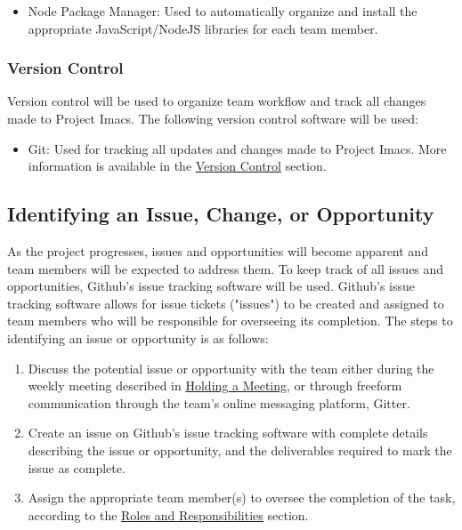 \documentclass{article}
\begin{document}
\begin{itemize}
\item Node Package Manager: Used to automatically organize and install the appropriate JavaScript/NodeJS libraries for each team member.
\end{itemize}

\subsubsection{Version Control}
Version control will be used to organize team workflow and track all changes made to Project Imacs. The following version control software will be used:

\begin{itemize}
\item Git: Used for tracking all updates and changes made to Project Imacs. More information is available in the \hyperref[sec:version-control]{Version Control} section.
\end{itemize}

\subsection{Identifying an Issue, Change, or Opportunity}
\label{sec:issues-opportunity}
As the project progresses, issues and opportunities will become apparent and team members will be expected to address them. To keep track of all issues and opportunities, Github's issue tracking software will be used. Github's issue tracking software allows for issue tickets ("issues") to be created and assigned to team members who will be responsible for overseeing its completion. The steps to identifying an issue or opportunity is as follows:

\begin{enumerate}
\item Discuss the potential issue or opportunity with the team either during the weekly meeting described in \hyperref[sec:hold-meeting]{Holding a Meeting}, or through freeform communication through the team's online messaging platform, Gitter.
\item Create an issue on Github's issue tracking software with complete details describing the issue or opportunity, and the deliverables required to mark the issue as complete.
\item Assign the appropriate team member(s) to oversee the completion of the task, according to the \hyperref[sec:roles-responsibilities]{Roles and Responsibilities} section.
\end{enumerate}
\end{document}

